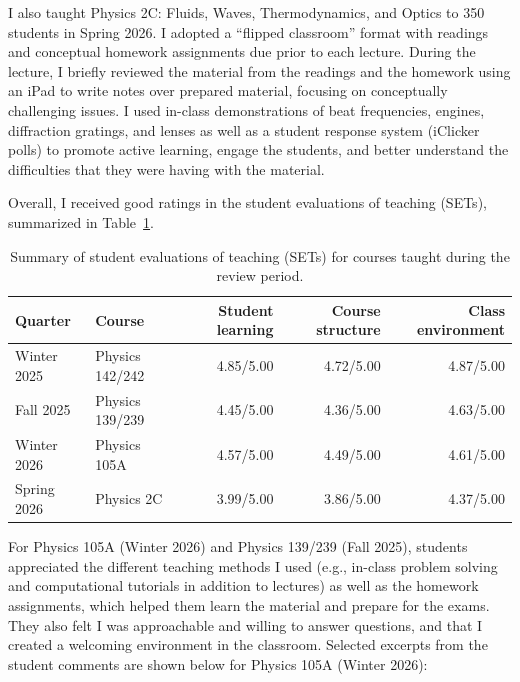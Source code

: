 \documentclass[11pt,letterpaper,notitlepage]{article}
\begin{document}
I also taught Physics 2C: Fluids, Waves, Thermodynamics, and Optics to 350 students in Spring 2026.
I adopted a ``flipped classroom'' format with readings and conceptual homework assignments due prior to each lecture.
During the lecture, I briefly reviewed the material from the readings and the homework using an iPad to write notes over prepared material, focusing on conceptually challenging issues.
I used in-class demonstrations of beat frequencies, engines, diffraction gratings, and lenses as well as a student response system (iClicker polls) to promote active learning, engage the students, and better understand the difficulties that they were having with the material.

Overall, I received good ratings in the student evaluations of teaching (SETs), summarized in Table~\ref{tab:set}.
\begin{table}[htpb]
    \centering
    \caption{Summary of student evaluations of teaching (SETs) for courses taught during the review period.}
    \begin{tabular}{ll|rrr}
        Quarter     & Course          & Student learning & Course structure & Class environment \\\hline
        Winter 2025 & Physics 142/242 & 4.85/5.00        & 4.72/5.00        & 4.87/5.00         \\
        Fall 2025   & Physics 139/239 & 4.45/5.00        & 4.36/5.00        & 4.63/5.00         \\
        Winter 2026 & Physics 105A    & 4.57/5.00        & 4.49/5.00        & 4.61/5.00         \\
        Spring 2026 & Physics 2C      & 3.99/5.00        & 3.86/5.00        & 4.37/5.00         \\
    \end{tabular}
    \label{tab:set}
\end{table}
For Physics 105A (Winter 2026) and Physics 139/239 (Fall 2025), students appreciated the different teaching methods I used (e.g., in-class problem solving and computational tutorials in addition to lectures) as well as the homework assignments, which helped them learn the material and prepare for the exams.
They also felt I was approachable and willing to answer questions, and that I created a welcoming environment in the classroom.
Selected excerpts from the student comments are shown below for Physics 105A (Winter 2026):
\end{document}
